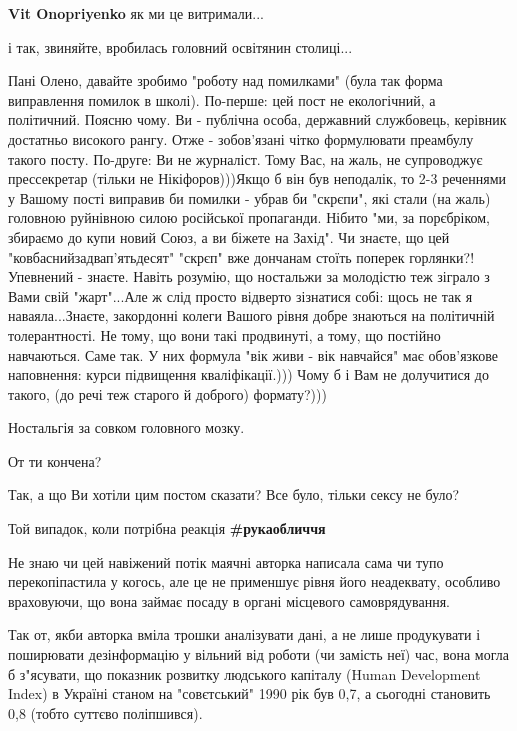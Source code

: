 \begin{itemize}
\textbf{Vit Onopriyenko} як ми це витримали...

і так, звиняйте, вробилась головний освітянин столиці...


Пані Олено, давайте зробимо "роботу над помилками" (була так форма виправлення
помилок в школі). По-перше: цей пост не екологічний, а політичний. Поясню чому.
Ви - публічна особа, державний службовець, керівник достатньо високого рангу.
Отже - зобов'язані чітко формулювати преамбулу такого посту. По-друге: Ви не
журналіст. Тому Вас, на жаль, не супроводжує прессекретар (тільки не
Нікіфоров)))Якщо б він був неподалік, то 2-3 реченнями у Вашому пості виправив
би помилки - убрав би "скрєпи", які стали (на жаль) головною руйнівною силою
російської пропаганди. Нібито "ми, за порєбріком, збираємо до купи новий Союз,
а ви біжете на Захід". Чи знаєте, що цей "ковбаснийзадвап'ятьдесят" "скрєп" вже
дончанам стоїть поперек горлянки?! Упевнений - знаєте. Навіть розумію, що
ностальжи за молодістю теж зіграло з Вами свій "жарт"...Але ж слід просто
відверто зізнатися собі: щось не так я наваяла...Знаєте, закордонні колеги
Вашого рівня добре знаються на політичній толерантності. Не тому, що вони такі
продвинуті, а тому, що постійно навчаються. Саме так. У них формула "вік живи -
вік навчайся" має обов'язкове наповнення: курси підвищення кваліфікації.)))
Чому б і Вам не долучитися до такого, (до речі теж старого й доброго)
формату?)))


Ностальгія за совком головного мозку.

От ти кончена?

Так, а що Ви хотіли цим постом сказати? Все було, тільки сексу не було?

Той випадок, коли потрібна реакція \textbf{\#рукаобличчя}


Не знаю чи цей навіжений потік маячні авторка написала сама чи тупо
перекопіпастила у когось, але це не применшує рівня його неадеквату, особливо
враховуючи, що вона займає посаду в органі місцевого самоврядування.

Так от, якби авторка вміла трошки аналізувати дані, а не лише продукувати і
поширювати дезінформацію у вільний від роботи (чи замість неї) час, вона могла
б з"ясувати, що показник розвитку людського капіталу (Human Development Index)
в Україні станом на "совєтський" 1990 рік був 0,7, а сьогодні становить 0,8
(тобто суттєво поліпшився).


\end{itemize}
